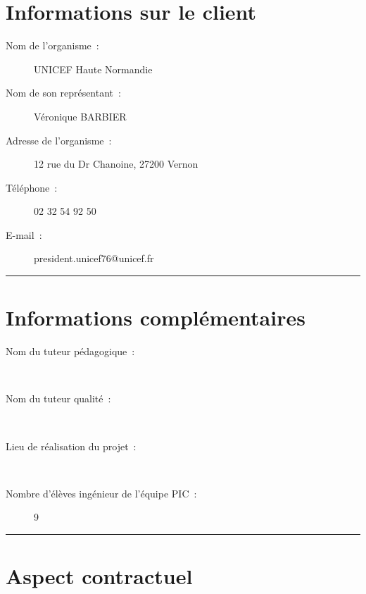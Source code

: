 	
\section*{Informations sur le client}
	\begin{description}
		\item[Nom de l'organisme~:] UNICEF Haute Normandie \\
		\item[Nom de son représentant~:] Véronique BARBIER \\
		\item[Adresse de l'organisme~:] 12 rue  du Dr Chanoine, 27200 Vernon \\
		\item[Téléphone~:] 02 32 54 92 50 \\
		\item[E-mail~:] president.unicef76@unicef.fr \\
	\end{description}
	
	
	\vspace{1cm}
	\noindent\hfil\rule{\textwidth}{.4pt}\hfil
	\vspace{1cm}	
	
\section*{Informations complémentaires}
	
	\begin{description}
	
		\item[Nom du tuteur pédagogique~:] \nomTuteurPedago \\
		\item[Nom du tuteur qualité~:] \nomTuteurQualite \\
		\item[Lieu de réalisation du projet~:] \adresseSalle \\
		\item[Nombre d'élèves ingénieur de l'équipe PIC~:] 9 \\
	\end{description}	
	
	\noindent\hfil\rule{\textwidth}{.4pt}\hfil	
	
	\section*{Aspect contractuel}
	
